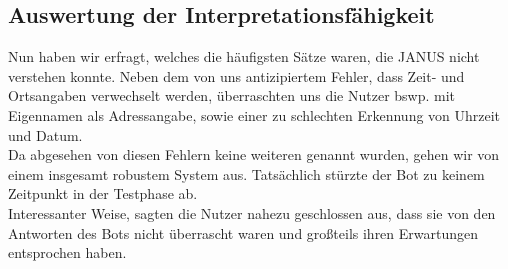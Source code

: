 \subsection{Auswertung der Interpretationsfähigkeit}
Nun haben wir erfragt, welches die häufigsten Sätze waren, die JANUS nicht verstehen konnte. Neben dem von uns antizipiertem Fehler, dass Zeit- und Ortsangaben verwechselt werden, überraschten uns die Nutzer bswp. mit Eigennamen als Adressangabe, sowie einer zu schlechten Erkennung von Uhrzeit und Datum.\\
Da abgesehen von diesen Fehlern keine weiteren genannt wurden, gehen wir von einem insgesamt robustem System aus. Tatsächlich stürzte der Bot zu keinem Zeitpunkt in der Testphase ab.\\

Interessanter Weise, sagten die Nutzer nahezu geschlossen aus, dass sie von den Antworten des Bots nicht überrascht waren und großteils ihren Erwartungen entsprochen haben.
